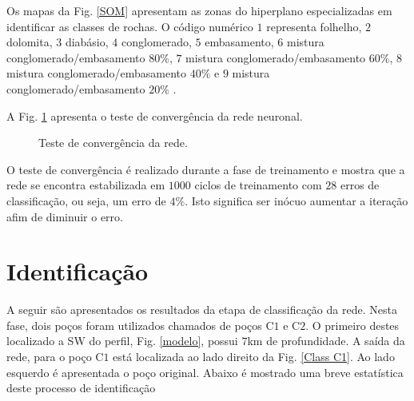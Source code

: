 Os mapas da Fig. \ref{SOM} apresentam as zonas do hiperplano especializadas em identificar as classes de rochas. O código numérico $1$ representa folhelho, $2$ dolomita, $3$ diabásio, $4$ conglomerado, $5$ embasamento, $6$ mistura conglomerado/embasamento $80\%$, $7$ mistura conglomerado/embasamento $60\%$, $8$ mistura conglomerado/embasamento $40\%$ e $9$ mistura conglomerado/embasamento $20\%$ .

A Fig. \ref{convergencia} apresenta o teste de convergência da rede neuronal.

\begin{figure}[H]
	\centering
	\setlength{\fboxsep}{8pt}
	\setlength{\fboxrule}{0.1pt}
	\caption{Teste de convergência da rede.}
	\label{convergencia}
\end{figure} 

O teste de convergência é realizado durante a fase de treinamento e mostra que a rede se encontra estabilizada em  $1000$ ciclos de treinamento com $28$ erros de classificação, ou seja, um erro de $4\%$. Isto significa ser inócuo aumentar a iteração afim de diminuir o erro. 



\section{Identificação}

A seguir são apresentados os resultados da etapa de classificação da rede. Nesta fase, dois poços foram utilizados chamados de poços C$1$ e C$2$. O primeiro destes localizado a SW do perfil, Fig. \ref{modelo}, possui $7$km de profundidade. A saída da rede, para o poço C$1$ está localizada ao lado direito da Fig. \ref{Class C1}. Ao lado esquerdo é apresentada o poço original. Abaixo é mostrado uma breve estatística deste processo de identificação 


